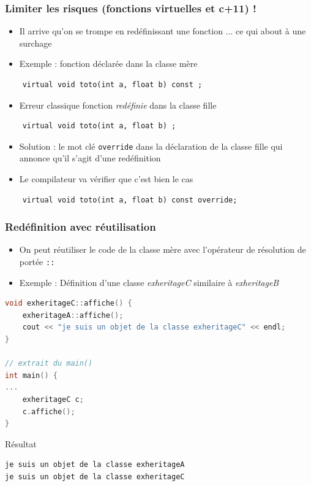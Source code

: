 \begin{frame}[fragile]
\frametitle{Limiter les risques (fonctions virtuelles et c+11) !}
  \begin{itemize}
    \item Il arrive qu'on se trompe en redéfinissant une fonction ... ce qui about à une surchage 
    \item Exemple : fonction déclarée dans la classe mère 
  \end{itemize}
  \begin{lstlisting}
    virtual void toto(int a, float b) const ; 
  \end{lstlisting}
  \begin{itemize}
    \item Erreur classique fonction \emph{redéfinie} dans la classe fille 
  \end{itemize}
  \begin{lstlisting}
    virtual void toto(int a, float b) ; 
  \end{lstlisting}
  \begin{itemize}
    \item Solution : le mot clé \texttt{override} dans la déclaration de la classe fille qui annonce qu'il s'agit d'une redéfinition
    \item Le compilateur va vérifier que c'est bien le cas
  \end{itemize}
  \begin{lstlisting}
    virtual void toto(int a, float b) const override; 
  \end{lstlisting}
\end{frame}
%
\begin{frame}[fragile]
\frametitle{{\href{code/heritageC.cxx}{}}  Redéfinition avec réutilisation}
\begin{itemize}
	\item On peut réutiliser le code de la classe mère avec l'opérateur de résolution de portée \texttt{::}
	\item Exemple : Définition d'une classe \textit{exheritageC} similaire à \textit{exheritageB}
\end{itemize}
\begin{lstlisting}[language=C++]
void exheritageC::affiche() {
    exheritageA::affiche();
    cout << "je suis un objet de la classe exheritageC" << endl;
}

// extrait du main()
int main() {
...
    exheritageC c;
    c.affiche();
}
\end{lstlisting}
\pause \begin{block}{Résultat}
{\tiny \begin{verbatim}
je suis un objet de la classe exheritageA
je suis un objet de la classe exheritageC
\end{verbatim}}
\end{block}
\end{frame}

